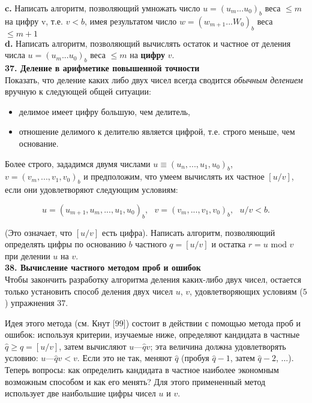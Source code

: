 \textbf{c.} Написать алгоритм, позволяющий умножать число $u = (u_{m} ... u_{0})_{b}$ веса $\leqslant m$ на цифру v, т.е. $v < b$, имея результатом число $w = (w_{m+1} ... W_{0})_{b}$ веса $\leqslant m+1$\\

\textbf{d.} Написать алгоритм, позволяющий вычислять остаток и частное от деления числа $u = (u_{m} ... u_{0})_{b}$ веса $\leqslant m$ на \textbf{цифру} $v$.
\\

\noindent\textbf{37. Деление в арифметике повышенной точности}\\

Показать, что деление каких либо двух чисел всегда сводится \textit{обычным делением} вручную к следующей общей ситуации:

\begin{itemize}
\item делимое имеет цифру большую, чем делитель,
\item отношение делимого к делителю является цифрой, т.е. строго меньше, чем основание.
\end{itemize}

Более строго, зададимся двумя числами $u \equiv (u_n,...,u_1,u_0)_b$, $v = (v_m,..., v_1,v_0)_b$ и предположим, что умеем вычислять их частное $[u/v]$, если они удовлетворяют следующим условиям:

$$
u = (u_{m+1}, u_m,...,u_1,u_0)_b, \text{ } v = (v_m,..., v_1,v_0)_b, \text{ } u/v<b.
$$

(Это означает, что $[u/v]$ есть цифра). Написать алгоритм, позволяющий определять цифры по основанию $b$ частного $q = [u/v]$ и остатка $r = u \text{ mod } v$ при делении $u$ на $v$.
\\

\noindent\textbf{38. Вычисление частного методом проб и ошибок}\\

Чтобы закончить разработку алгоритма деления каких-либо двух чисел, остается только установить способ деления двух чисел $u$, $v$, удовлетворяющих условиям ($5$) упражнения $37$.

Идея этого метода (см. Кнут [$99$]) состоит в действии с помощью метода проб и ошибок: используя критерии, изучаемые ниже, определяют кандидата в частные $\widehat{q} \geqslant q = [u/v]$, затем вычисляют $u — \widehat{q}v$; эта величина должна удовлетворять условию: $u — \widehat{q}v < v$. Если это не так, меняют $\widehat{q}$ (пробуя $\widehat{q}-1$, затем $\widehat{q}-2$, ...). Теперь вопросы: как определить кандидата в частное наиболее экономным возможным способом и как его менять? Для этого примененный метод использует две наибольшие цифры чисел $u$ и $v$.
\newpage

